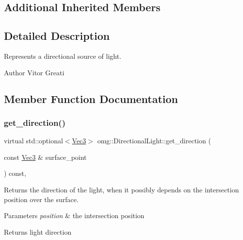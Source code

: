 \subsection*{Additional Inherited Members}


\subsection{Detailed Description}
Represents a directional source of light. 

\begin{DoxyAuthor}{Author}
Vitor Greati 
\end{DoxyAuthor}


\subsection{Member Function Documentation}
\mbox{\label{classomg_1_1_directional_light_a5f5f490112ecf2c0dfb2613d1f831e5b}} 
\subsubsection{\texorpdfstring{get\_direction()}{get\_direction()}}
{\footnotesize\ttfamily virtual std\+::optional$<$\mbox{\hyperlink{namespaceomg_a45a9482677fee9933ff369b49894e316}{Vec3}}$>$ omg\+::\+Directional\+Light\+::get\+\_\+direction (\begin{DoxyParamCaption}\item[{const \mbox{\hyperlink{namespaceomg_a45a9482677fee9933ff369b49894e316}{Vec3}} \&}]{surface\+\_\+point }\end{DoxyParamCaption}) const\hspace{0.3cm}{\ttfamily [inline]}, {\ttfamily [virtual]}}



Returns the direction of the light, when it possibly depends on the intersection position over the surface. 


\begin{DoxyParams}{Parameters}
{\em position} & the intersection position \\
\hline
\end{DoxyParams}
\begin{DoxyReturn}{Returns}
light direction 
\end{DoxyReturn}
\mbox{\label{classomg_1_1_directional_light_ae7df9384508e8692781f1e1df03ccf4e}} 
